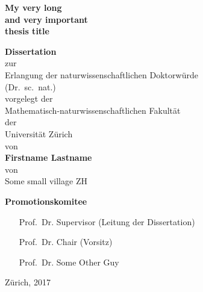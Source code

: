 %
% 
%

\begin{titlepage}

\begin{center}

\vfill
\hr

\vspace{20pt}

\textbf{
\Huge{My very long}\\
\Huge{and very important}\\[.2em]
\Huge{thesis title}
}

\vspace{20pt}

\hr

\vfill

\begin{spacing}{1.25}
    \textbf{\Large{Dissertation}}\\
    zur\\
    Erlangung der naturwissenschaftlichen Doktorwürde\\
    (Dr.~sc.~nat.)\\
    vorgelegt der\\
    Mathematisch-naturwissenschaftlichen Fakultät\\
    der\\
    Universität Zürich\\
    von\\[2em]
    \textbf{\Large Firstname Lastname}\\[2em]
    von\\
    Some small village ZH\\
\end{spacing}

\vfill

\hr

\vspace{1em}

\textbf{\Large Promotionskomitee}

\vspace{1em}

\hfill\begin{minipage}{0.6\textwidth}
\begin{itemize}
    \item[Prof.~Dr.]Supervisor (Leitung der Dissertation)\vspace{-8pt}
    \item[Prof.~Dr.]Chair  (Vorsitz)\vspace{-8pt}
    \item[Prof.~Dr.]Some Other Guy\vspace{-8pt}
\end{itemize}
\end{minipage}\hspace{20pt}

\vspace{2em}

\hr

\vspace{2em}

Zürich, 2017

\end{center}
\end{titlepage}
